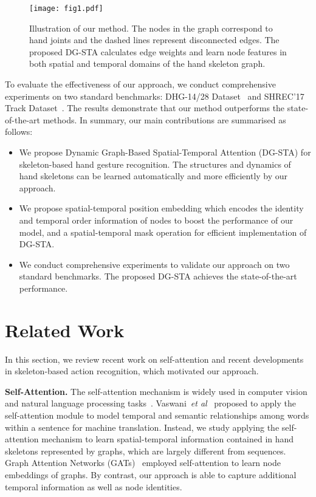 \documentclass{bmvc2k}
\def\etal{\emph{et al}\bmvaOneDot}
\begin{document}
\begin{figure}[t]
\texttt{[image: fig1.pdf]}
\caption{Illustration of our method. The nodes in the graph correspond to hand joints and the dashed lines represent disconnected edges. The proposed DG-STA calculates edge weights and learn node features in both spatial and temporal domains of the hand skeleton graph.}
\label{fig:overview}
\end{figure}

To evaluate the effectiveness of our approach, we conduct comprehensive experiments on two standard benchmarks: DHG-14/28 Dataset~\cite{de2016skeleton} and SHREC'17 Track Dataset~\cite{de2017shrec}. The results demonstrate that our method outperforms the state-of-the-art methods. In summary, our main contributions are summarised as follows:
\begin{itemize}
\item We propose Dynamic Graph-Based Spatial-Temporal Attention (DG-STA) for skeleton-based hand gesture recognition. The structures and dynamics of hand skeletons can be learned automatically and more efficiently by our approach.
\item We propose spatial-temporal position embedding which encodes the identity and temporal order information of nodes to boost the performance of our model, and a spatial-temporal mask operation for efficient implementation of DG-STA.
\item We conduct comprehensive experiments to validate our approach on two standard benchmarks. The proposed DG-STA achieves the state-of-the-art performance.
\end{itemize} \section{Related Work}

In this section, we review recent work on self-attention  and recent developments in skeleton-based action recognition, which motivated our approach.

\textbf{Self-Attention.} 
The self-attention mechanism is widely used in computer vision and natural language processing tasks~\cite{chen2018factual,chen2018twitter,chen2018commerce,ZhangGMO19,lin2017structured,tan2018deep,verga2018simultaneously,tian2018cr}.
Vaswani~\etal~\cite{vaswani2017attention} proposed to apply the self-attention  module to model temporal and semantic relationships among words within a sentence for machine translation. Instead, we study applying the self-attention mechanism to learn spatial-temporal information contained in hand skeletons represented by graphs, which are largely different from sequences. Graph Attention Networks (GATs)~\cite{velivckovic2017graph} employed self-attention to learn node embeddings of graphs. By contrast, our approach is able to capture additional temporal information as well as node identities. 
\end{document}
